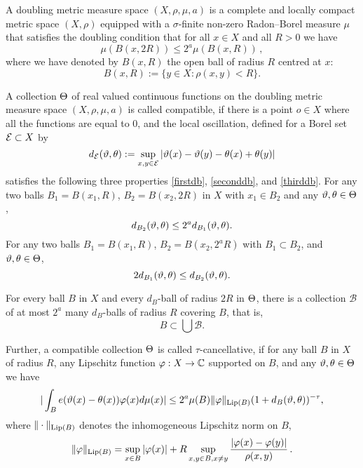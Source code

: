 A doubling metric measure space  $(X,\rho,\mu, a)$ is a complete
and locally compact metric space $(X,\rho)$
equipped with a $\sigma$-finite non-zero Radon--Borel measure $\mu$ that satisfies the doubling condition that for all $x\in X$ and all $R>0$ we have
\begin{equation}\label{doublingx}
    \mu(B(x,2R))\le 2^a\mu(B(x,R))\,,
\end{equation}
where we have denoted by $B(x,R)$ the open ball of radius $R$ centred at $x$:
\begin{equation}\label{eq define ball}
 B(x,R):=\{y\in X: \rho(x,y)<R\}. \end{equation}


A  collection $\Theta$ of real valued continuous functions on the doubling metric measure space $(X,\rho,\mu,a)$ is called compatible, if there is a point $o\in X$ where all the functions are equal to $0$, and the  local oscillation, defined for a Borel set $\mathcal{E}\subset X$ by
\begin{equation}\label{definedE}
    d_{\mathcal{E}}(\vartheta,\theta):=\sup_{x,y\in \mathcal{E}}|\vartheta(x)-{\vartheta(y)}- \theta(x)+{\theta(y)}|
\end{equation}
satisfies the following three properties
\eqref{firstdb}, \eqref{seconddb}, and \eqref{thirddb}.
For any two balls $B_1=B(x_1,R)$, $B_2= B(x_2,2R)$ in $X$ with $x_1\in B_2$  and any $\vartheta,\theta\in \Theta$,
\begin{equation}\label{firstdb}
    d_{B_2}(\vartheta,\theta)\le 2^a d_{B_1}(\vartheta,\theta) .
\end{equation}
For any two balls
$B_1=B(x_1,R)$, $B_2= B(x_2,2^aR)$
with $B_1\subset B_2$, and $\vartheta,\theta\in \Theta$,
\begin{equation}\label{seconddb}
    2d_{B_1}(\vartheta,\theta)
\le d_{B_2}(\vartheta,\theta) .
\end{equation}



For every ball $B$ in $X$ and
every $d_B$-ball of radius $2R$ in $\Theta$, there is a collection $\mathcal{B}$ of
at most $2^a$ many  $d_B$-balls of radius $R$ covering $B$, that is,
\begin{equation}\label{thirddb}
    B\subset \bigcup \mathcal{B}.
\end{equation}


Further, a compatible collection $\Theta$ is called $\tau$-cancellative, if
for any ball $B$ in $X$ of radius $R$, any Lipschitz function $\varphi: X\to \mathbb{C}$
supported on $B$, and any $\vartheta,\theta\in \Theta$ we have
\begin{equation}
    \label{eq vdc cond}
    |\int_B e(\vartheta(x)-{\theta(x)}) \varphi(x) d\mu(x)|\le 2^a  \mu(B)\|\varphi\|_{\operatorname{\operatorname{Lip}}(B)}
(1+d_B(\vartheta,\theta))^{-\tau},
\end{equation}
where $\|\cdot\|_{\operatorname{\operatorname{Lip}}(B)}$ denotes the inhomogeneous Lipschitz norm on $B$,
$$
    \|\varphi\|_{\operatorname{\operatorname{Lip}}(B)} = \sup_{x \in B} |\varphi(x)| + R \sup_{x,y \in B, x \neq y} \frac{|\varphi(x) - \varphi(y)|}{\rho(x,y)}\,.
$$




